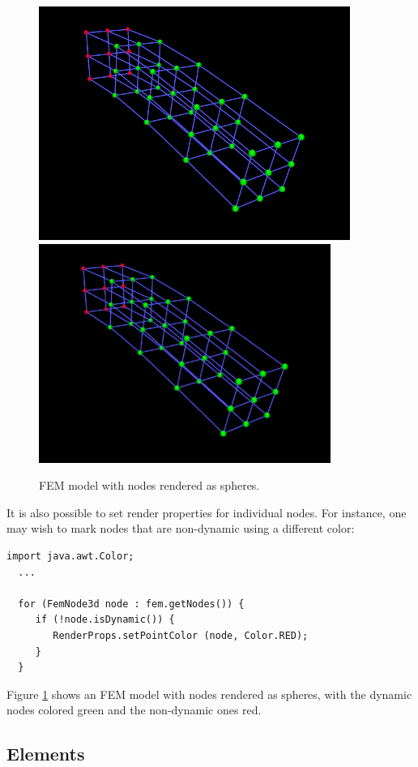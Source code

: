 \begin{figure}[h]
\begin{center}
\iflatexml
 \includegraphics[]{images/femGreenNodes}
\else
 \includegraphics[width=3.75in]{images/femGreenNodes}
\fi
\end{center}
\caption{FEM model with nodes rendered as spheres.}
\label{femGreenNodes:fig} 
\end{figure}

It is also possible to set render properties for individual nodes.
For instance, one may wish to mark nodes that are non-dynamic using a
different color:
%
\begin{lstlisting}[]
import java.awt.Color;
  ...

  for (FemNode3d node : fem.getNodes()) {
     if (!node.isDynamic()) {
        RenderProps.setPointColor (node, Color.RED);
     }
  }
\end{lstlisting}
%
Figure \ref{femGreenNodes:fig} shows an FEM model with nodes rendered
as spheres, with the dynamic nodes colored green and the non-dynamic
ones red.

\subsection{Elements}
\label{ElementRendering:sec}

